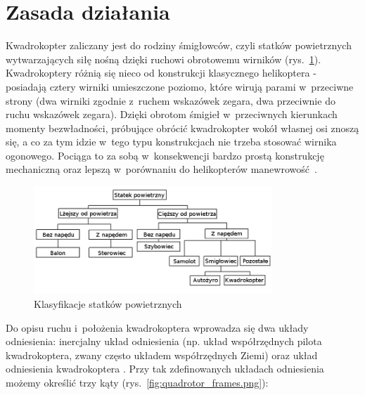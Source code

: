 \documentclass[11pt, twoside]{Thesis} %
\begin{document}


\section{Zasada działania}
Kwadrokopter zaliczany jest do rodziny śmigłowców, czyli statków powietrznych wytwarzających siłę nośną dzięki ruchowi obrotowemu wirników (rys.~\ref{fig:quadrotor_clasification.png}). Kwadrokoptery różnią się nieco od konstrukcji klasycznego helikoptera - posiadają cztery wirniki umieszczone poziomo, które wirują parami w~przeciwne strony (dwa wirniki zgodnie z~ruchem wskazówek zegara, dwa przeciwnie do ruchu wskazówek zegara). Dzięki obrotom śmigieł w~przeciwnych kierunkach momenty bezwładności, próbujące obrócić kwadrokopter wokół własnej osi znoszą się, a co za tym idzie w~tego typu konstrukcjach nie trzeba stosować wirnika ogonowego. Pociąga to za sobą w~konsekwencji bardzo prostą konstrukcję mechaniczną oraz lepszą w~porównaniu do helikopterów manewrowość~\cite{quadro1}. 

\begin{figure}[htbp]
	\centering
		\includegraphics[width=0.8\textwidth]{Pictures/quadrotor_clasification2.png}
		\caption[Klasyfikacja statków powietrznych]{Klasyfikacje statków powietrznych~\cite{quadro2, quadro3}}
		\label{fig:quadrotor_clasification.png}
\end{figure}

Do opisu ruchu i~położenia kwadrokoptera wprowadza się dwa układy odniesienia: inercjalny układ odniesienia (np. układ współrzędnych pilota kwadrokoptera, zwany często układem współrzędnych Ziemi) oraz układ odniesienia kwadrokoptera \cite{quadro4, quadro5}. Przy tak zdefinowanych układach odniesienia możemy określić trzy kąty (rys.~\ref{fig:quadrotor_frames.png}):
\end{document}
